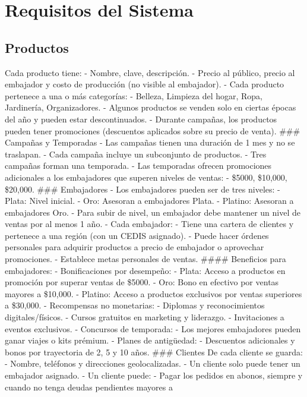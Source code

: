 \documentclass[
  letterpaper,
  DIV=11,
  numbers=noendperiod]{scrreprt}
\begin{document}
\section{Requisitos del Sistema}\label{requisitos-del-sistema}

\subsection{Productos}\label{productos-1}

Cada producto tiene: - Nombre, clave, descripción. - Precio al público,
precio al embajador y costo de producción (no visible al embajador). -
Cada producto pertenece a una o más categorías: - Belleza, Limpieza del
hogar, Ropa, Jardinería, Organizadores. - Algunos productos se venden
solo en ciertas épocas del año y pueden estar descontinuados. - Durante
campañas, los productos pueden tener promociones (descuentos aplicados
sobre su precio de venta). \#\#\# Campañas y Temporadas - Las campañas
tienen una duración de 1 mes y no se traslapan. - Cada campaña incluye
un subconjunto de productos. - Tres campañas forman una temporada. - Las
temporadas ofrecen promociones adicionales a los embajadores que superen
niveles de ventas: - \$5000, \$10,000, \$20,000. \#\#\# Embajadores -
Los embajadores pueden ser de tres niveles: - Plata: Nivel inicial. -
Oro: Asesoran a embajadores Plata. - Platino: Asesoran a embajadores
Oro. - Para subir de nivel, un embajador debe mantener un nivel de
ventas por al menos 1 año. - Cada embajador: - Tiene una cartera de
clientes y pertenece a una región (con un CEDIS asignado). - Puede hacer
órdenes personales para adquirir productos a precio de embajador o
aprovechar promociones. - Establece metas personales de ventas. \#\#\#\#
Beneficios para embajadores: - Bonificaciones por desempeño: - Plata:
Acceso a productos en promoción por superar ventas de \$5000. - Oro:
Bono en efectivo por ventas mayores a \$10,000. - Platino: Acceso a
productos exclusivos por ventas superiores a \$30,000. - Recompensas no
monetarias: - Diplomas y reconocimientos digitales/físicos. - Cursos
gratuitos en marketing y liderazgo. - Invitaciones a eventos exclusivos.
- Concursos de temporada: - Los mejores embajadores pueden ganar viajes
o kits prémium. - Planes de antigüedad: - Descuentos adicionales y bonos
por trayectoria de 2, 5 y 10 años. \#\#\# Clientes De cada cliente se
guarda: - Nombre, teléfonos y direcciones geolocalizadas. - Un cliente
solo puede tener un embajador asignado. - Un cliente puede: - Pagar los
pedidos en abonos, siempre y cuando no tenga deudas pendientes mayores a
\end{document}
